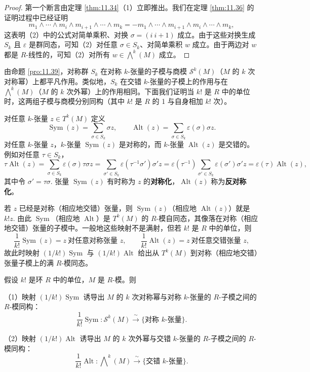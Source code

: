 \begin{proof}
第一个断言由定理 \ref{thm:11.34}（1）立即推出。我们在定理 \ref{thm:11.36} 的证明过程中已经证明
\[
m_1 \wedge \cdots \wedge m_i \wedge m_{i+1} \wedge \cdots \wedge m_k = -m_1 \wedge \cdots \wedge m_{i+1} \wedge m_i \wedge \cdots \wedge m_k,
\]
这表明（2）中的公式对简单乘积、对换 \(\sigma = (i\ i+1)\) 成立。由于这些对换生成 \(S_k\) 且 \(\varepsilon\) 是群同态，可知（2）对任意 \(\sigma \in S_k\)、对简单乘积 \(w\) 成立。由于两边对 \(w\) 都是 \(R\)-线性的，可知（2）对所有 \(w \in \bigwedge^k(M)\) 成立。
\end{proof}

由命题 \ref{pro:11.39}，对称群 \(S_k\) 在对称 \(k\)-张量的子模与商模 \(\mathcal{S}^k(M)\)（\(M\) 的 \(k\) 次对称幂）上都平凡作用。类似地，\(S_k\) 在交错 \(k\)-张量的子模上的作用与在 \(\bigwedge^k(M)\)（\(M\) 的 \(k\) 次外幂）上的作用相同。下面我们证明当 \(k!\) 是 \(R\) 中的单位时，这两组子模与商模分别同构（其中 \(k!\) 是 \(R\) 的 1 与自身相加 \(k!\) 次）。

对任意 \(k\)-张量 \(z \in T^k(M)\) 定义
\[
\operatorname{Sym}(z) = \sum_{\sigma \in S_k} \sigma z, \qquad \operatorname{Alt}(z) = \sum_{\sigma \in S_k} \varepsilon(\sigma)\sigma z.
\]
对任意 \(k\)-张量 \(z\)，\(k\)-张量 \(\operatorname{Sym}(z)\) 是对称的，而 \(k\)-张量 \(\operatorname{Alt}(z)\) 是交错的。例如对任意 \(\tau \in S_k\)，
\[
\tau\operatorname{Alt}(z) = \sum_{\sigma \in S_k}\varepsilon(\sigma)\tau\sigma z = \sum_{\sigma' \in S_k}\varepsilon(\tau^{-1}\sigma')\sigma' z = \varepsilon(\tau^{-1})\sum_{\sigma' \in S_k}\varepsilon(\sigma')\sigma' z = \varepsilon(\tau)\operatorname{Alt}(z),
\]
其中令 \(\sigma' = \tau\sigma\). 张量 \(\operatorname{Sym}(z)\) 有时称为 \(z\) 的\textbf{对称化}，\(\operatorname{Alt}(z)\) 称为\textbf{反对称化}。

若 \(z\) 已经是对称（相应地交错）张量，则 \(\operatorname{Sym}(z)\)（相应地 \(\operatorname{Alt}(z)\)）就是 \(k!z\). 由此 \(\operatorname{Sym}\)（相应地 \(\operatorname{Alt}\)）是 \(T^k(M)\) 的 \(R\)-模自同态，其像落在对称（相应地交错）张量的子模中。一般地这些映射不是满射，但若 \(k!\) 是 \(R\) 中的单位，则
\[
\frac{1}{k!}\operatorname{Sym}(z) = z \ \text{对任意对称张量 } z, \qquad \frac{1}{k!}\operatorname{Alt}(z) = z \ \text{对任意交错张量 } z,
\]
故此时映射 \((1/k!)\operatorname{Sym}\) 与 \((1/k!)\operatorname{Alt}\) 给出从 \(T^k(M)\) 到对称（相应地交错）张量子模上的满 \(R\)-模同态。

\begin{proposition}\label{pro:11.40}
假设 \(k!\) 是环 \(R\) 中的单位，\(M\) 是 \(R\)-模。则

（1）映射 \((1/k!)\operatorname{Sym}\) 诱导出 \(M\) 的 \(k\) 次对称幂与对称 \(k\)-张量的 \(R\)-子模之间的 \(R\)-模同构：
\[
\frac{1}{k!}\operatorname{Sym} : \mathcal{S}^k(M) \xrightarrow{\ \sim\ } \{\text{对称 } k\text{-张量}\}.
\]

（2）映射 \((1/k!)\operatorname{Alt}\) 诱导出 \(M\) 的 \(k\) 次外幂与交错 \(k\)-张量的 \(R\)-子模之间的 \(R\)-模同构：
\[
\frac{1}{k!}\operatorname{Alt} : \bigwedge\nolimits^k(M) \xrightarrow{\ \sim\ } \{\text{交错 } k\text{-张量}\}.
\]
\end{proposition}

